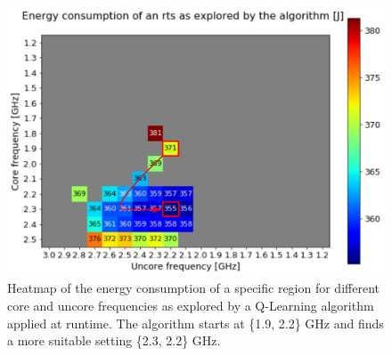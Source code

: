 \begin{figure}[!t]
\centering
\includegraphics[width=.8\columnwidth]{figures/q_learning.png}
\caption{Heatmap of the energy consumption of a specific region for different core and uncore frequencies as explored by a Q-Learning algorithm applied at runtime.
The algorithm starts at \{1.9, 2.2\} GHz and finds a more suitable setting \{2.3, 2.2\} GHz.}
\label{fig:qlearning}
\end{figure}

% 
